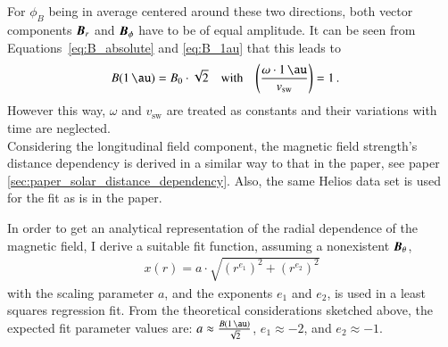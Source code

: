 For $\phi_B$ being in average centered around these two directions, both vector components $\boldsymbol{B}_r$ and $\boldsymbol{B}_\phi$ have to be of equal amplitude. It can be seen from Equations~\ref{eq:B_absolute} and \ref{eq:B_1au} that this leads to
\begin{align}
	B(\SI{1}{\au}) &= B_0 \cdot \sqrt{2}	&\text{with}	&	&	\left(\frac{\omega\cdot\SI{1}{\au}}{v_\text{sw}}\right) &= 1\,.
\end{align}
However this way, $\omega$ and $v_\text{sw}$ are treated as constants and their variations with time are neglected.\\

Considering the longitudinal field component, the magnetic field strength's distance dependency is derived in a similar way to that in the paper, see paper \autoref{sec:paper_solar_distance_dependency}. Also, the same Helios data set is used for the fit as is in the paper.

In order to get an analytical representation of the radial dependence of the magnetic field, I derive a suitable fit function, assuming a nonexistent $\boldsymbol{B}_\theta$,
\begin{align}
	x(r) = a \cdot \sqrt{\left(r^{e_1}\right)^2 + \left(r^{e_2}\right)^2}	\label{eq:sqare_power_law}
\end{align}
with the scaling parameter $a$, and the exponents $e_1$ and $e_2$, is used in a least squares regression fit. From the theoretical considerations sketched above, the expected fit parameter values are: $a \approx \frac{B(\SI{1}{\au})}{\sqrt{2}}$, $e_1 \approx -2$, and $e_2 \approx -1$.

